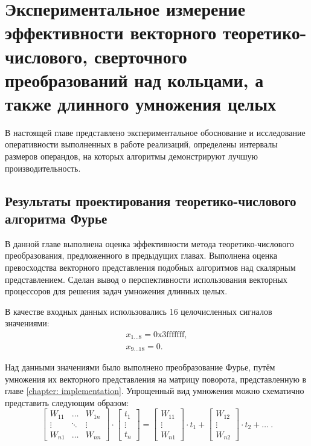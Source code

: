 \chapter{Экспериментальное измерение эффективности векторного теоретико-числового, сверточного преобразований над кольцами, а также длинного умножения целых}\label{chapter: experiments}
В настоящей главе представлено экспериментальное обоснование и исследование оперативности выполненных в работе реализаций, определены интервалы размеров операндов, на которых алгоритмы демонстрируют лучшую производительность.

\section{Результаты проектирования теоретико-числового алгоритма Фурье}
В данной главе выполнена оценка эффективности метода теоретико-числового преобразования, предложенного в предыдущих главах.
Выполнена оценка превосходства векторного представления подобных алгоритмов над скалярным представлением.
Сделан вывод о перспективности использования векторных процессоров для решения задач умножения длинных целых.

В качестве входных данных использовались 16 целочисленных сигналов значениями:
\begin{gather}
x_{1\dots8} = \textrm{0x3fffffff}, \\
x_{9\dots18} = 0.
\end{gather}

Над данными значениями было выполнено преобразование Фурье, путём умножения их векторного представления на матрицу поворота, представленную в главе \ref{chapter: implementation}.
Упрощенный вид умножения можно схематично представить следующим образом:
$$
\begin{bmatrix}
W_{11} &  \dots & W_{1n} \\
\vdots & \ddots & \vdots \\
W_{n1} &  \dots & W_{nn}
\end{bmatrix}
\cdot
\begin{bmatrix}
t_1    \\
\vdots \\
t_n
\end{bmatrix}
=
\begin{bmatrix}
W_{11} \\
\vdots \\
W_{n1}
\end{bmatrix}
\cdot t_1 +
\begin{bmatrix}
W_{12} \\
\vdots \\
W_{n2}
\end{bmatrix}
\cdot t_2 + \dots \medspace.
$$

